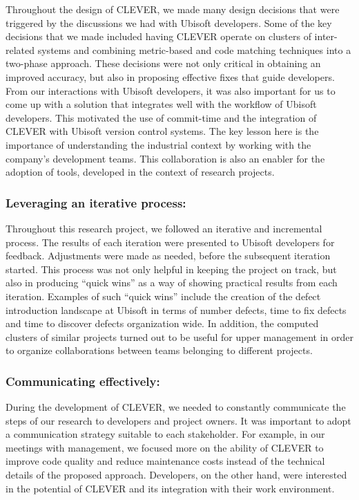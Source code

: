 \documentclass[sigconf]{acmart}
\begin{document}
Throughout the design of CLEVER, we made many design decisions that were
triggered by the discussions we had with Ubisoft developers. Some of the
key decisions that we made included having CLEVER operate on clusters of
inter-related systems and combining metric-based and code matching
techniques into a two-phase approach. These decisions were not only
critical in obtaining an improved accuracy, but also in proposing
effective fixes that guide developers. From our interactions with
Ubisoft developers, it was also important for us to come up with a
solution that integrates well with the workflow of Ubisoft developers.
This motivated the use of commit-time and the integration of CLEVER with
Ubisoft version control systems. The key lesson here is the importance
of understanding the industrial context by working with the company's
development teams. This collaboration is also an enabler for the
adoption of tools, developed in the context of research projects.

\subsubsection{Leveraging an iterative
process:}\label{leveraging-an-iterative-process}

Throughout this research project, we followed an iterative and
incremental process. The results of each iteration were presented to
Ubisoft developers for feedback. Adjustments were made as needed, before
the subsequent iteration started. This process was not only helpful in
keeping the project on track, but also in producing ``quick wins'' as a
way of showing practical results from each iteration. Examples of such
``quick wins'' include the creation of the defect introduction landscape
at Ubisoft in terms of number defects, time to fix defects and time to
discover defects organization wide. In addition, the computed clusters
of similar projects turned out to be useful for upper management in
order to organize collaborations between teams belonging to different
projects.

\subsubsection{Communicating
effectively:}\label{communicating-effectively}

During the development of CLEVER, we needed to constantly communicate
the steps of our research to developers and project owners. It was
important to adopt a communication strategy suitable to each
stakeholder. For example, in our meetings with management, we focused
more on the ability of CLEVER to improve code quality and reduce
maintenance costs instead of the technical details of the proposed
approach. Developers, on the other hand, were interested in the
potential of CLEVER and its integration with their work environment.
\end{document}
